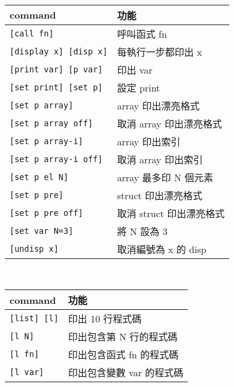 \begin{center}
     \\
    \begin{tabular}{|p{2.7cm}|p{2.7cm}|}
        \hline
        command                         & 功能 \\
        \hline
        \verb|[call fn]|                & 呼叫函式 fn \\
        \verb|[display x] [disp x]|     & 每執行一步都印出 x \\
        \verb|[print var] [p var]|      & 印出 var \\
        \verb|[set print] [set p]|      & 設定 print \\
        \verb|[set p array]|            & array 印出漂亮格式 \\
        \verb|[set p array off]|        & 取消 array 印出漂亮格式 \\
        \verb|[set p array-i]|          & array 印出索引 \\
        \verb|[set p array-i off]|      & 取消 array 印出索引 \\
        \verb|[set p el N]|             & array 最多印 N 個元素 \\
        \verb|[set p pre]|              & struct 印出漂亮格式 \\
        \verb|[set p pre off]|          & 取消 struct 印出漂亮格式 \\
        \verb|[set var N=3]|            & 將 N 設為 3 \\
        \verb|[undisp x]|               & 取消編號為 x 的 disp \\
        \hline
    \end{tabular}
    \columnbreak

     \\
    \begin{tabular}{|p{2.7cm}|p{2.7cm}|}
        \hline
        command                         & 功能 \\
        \hline
        \verb|[list] [l]|               & 印出 10 行程式碼  \\
        \verb|[l N]|                    & 印出包含第 N 行的程式碼  \\
        \verb|[l fn]|                   & 印出包含函式 fn 的程式碼 \\
        \verb|[l var]|                  & 印出包含變數 var 的程式碼 \\
        \hline
    \end{tabular} \\
    \hspace{\fill} \\
    \hspace{\fill} \\


\end{center}
